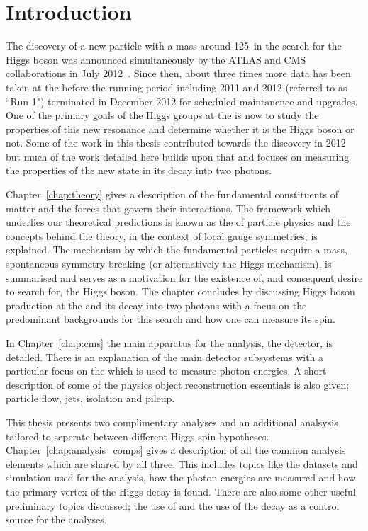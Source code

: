 \chapter{Introduction}
\label{chap:intro}

The discovery of a new particle with a mass around 125~\GeV in the search for the \SM Higgs boson was announced simultaneously by the ATLAS and CMS collaborations in July 2012~\cite{ATLASDiscovery,CMSDiscovery}. Since then, about three times more data has been taken at the \LHC before the running period including 2011 and 2012 (referred to as ``Run 1") terminated in December 2012 for scheduled maintanence and upgrades. One of the primary goals of the Higgs groups at the \LHC is now to study the properties of this new resonance and determine whether it is the \SM Higgs boson or not. Some of the work in this thesis contributed towards the discovery in 2012 but much of the work detailed here builds upon that and focuses on measuring the properties of the new state in its decay into two photons. 

Chapter~\ref{chap:theory} gives a description of the fundamental constituents of matter and the forces that govern their interactions. The framework which underlies our theoretical predictions is known as the \SM of particle physics and the concepts behind the theory, in the context of local gauge symmetries, is explained. The mechanism by which the fundamental particles acquire a mass, spontaneous symmetry breaking (or alternatively the Higgs mechanism), is summarised and serves as a motivation for the existence of, and consequent desire to search for, the Higgs boson. The chapter concludes by discussing Higgs boson production at the \LHC and its decay into two photons with a focus on the predominant backgrounds for this search and how one can measure its spin.

In Chapter~\ref{chap:cms} the main apparatus for the analysis, the \CMS detector, is detailed. There is an explanation of the main detector subsystems with a particular focus on the \ECAL which is used to measure photon energies. A short description of some of the physics object reconstruction essentials is also given; particle flow, jets, isolation and pileup.

This thesis presents two complimentary analyses and an additional analsysis tailored to seperate between different Higgs spin hypotheses. Chapter~\ref{chap:analysis_comps} gives a description of all the common analysis elements which are shared by all three. This includes topics like the datasets and \MC simulation used for the analysis, how the photon energies are measured and how the primary vertex of the Higgs decay is found. There are also some other useful preliminary topics discussed; the use of \BDTs and the use of the \Zee decay as a control source for the \Hgg analyses.

